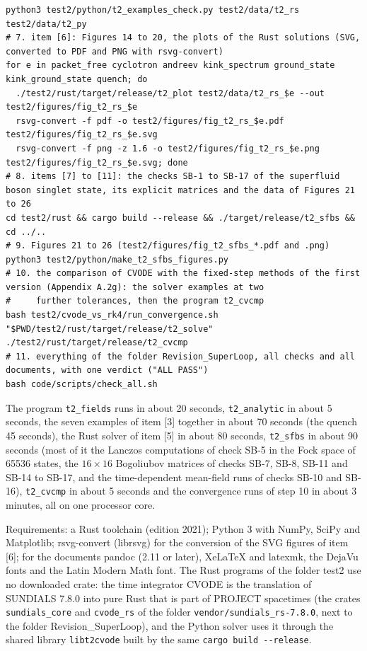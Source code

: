 \documentclass[
  10pt,
]{article}
\begin{document}
\begin{verbatim}
python3 test2/python/t2_examples_check.py test2/data/t2_rs test2/data/t2_py
# 7. item [6]: Figures 14 to 20, the plots of the Rust solutions (SVG, converted to PDF and PNG with rsvg-convert)
for e in packet_free cyclotron andreev kink_spectrum ground_state kink_ground_state quench; do
  ./test2/rust/target/release/t2_plot test2/data/t2_rs_$e --out test2/figures/fig_t2_rs_$e
  rsvg-convert -f pdf -o test2/figures/fig_t2_rs_$e.pdf test2/figures/fig_t2_rs_$e.svg
  rsvg-convert -f png -z 1.6 -o test2/figures/fig_t2_rs_$e.png test2/figures/fig_t2_rs_$e.svg; done
# 8. items [7] to [11]: the checks SB-1 to SB-17 of the superfluid boson singlet state, its explicit matrices and the data of Figures 21 to 26
cd test2/rust && cargo build --release && ./target/release/t2_sfbs && cd ../..
# 9. Figures 21 to 26 (test2/figures/fig_t2_sfbs_*.pdf and .png)
python3 test2/python/make_t2_sfbs_figures.py
# 10. the comparison of CVODE with the fixed-step methods of the first version (Appendix A.2g): the solver examples at two
#     further tolerances, then the program t2_cvcmp
bash test2/cvode_vs_rk4/run_convergence.sh "$PWD/test2/rust/target/release/t2_solve"
./test2/rust/target/release/t2_cvcmp
# 11. everything of the folder Revision_SuperLoop, all checks and all documents, with one verdict ("ALL PASS")
bash code/scripts/check_all.sh
\end{verbatim}

The program \texttt{t2\_fields} runs in about 20 seconds,
\texttt{t2\_analytic} in about 5 seconds, the seven examples of item
{[}3{]} together in about 70 seconds (the quench 45 seconds), the Rust
solver of item {[}5{]} in about 80 seconds, \texttt{t2\_sfbs} in about
90 seconds (most of it the Lanczos computations of check SB-5 in the
Fock space of 65536 states, the \(16\times16\) Bogoliubov matrices of
checks SB-7, SB-8, SB-11 and SB-14 to SB-17, and the time-dependent
mean-field runs of checks SB-10 and SB-16), \texttt{t2\_cvcmp} in about
5 seconds and the convergence runs of step 10 in about 3 minutes, all on
one processor core.

Requirements: a Rust toolchain (edition 2021); Python 3 with NumPy,
SciPy and Matplotlib; rsvg-convert (librsvg) for the conversion of the
SVG figures of item {[}6{]}; for the documents pandoc (2.11 or later),
XeLaTeX and latexmk, the DejaVu fonts and the Latin Modern Math font.
The Rust programs of the folder test2 use no downloaded crate: the time
integrator CVODE is the translation of SUNDIALS 7.8.0 into pure Rust
that is part of PROJECT spacetimes (the crates \texttt{sundials\_core}
and \texttt{cvode\_rs} of the folder \texttt{vendor/sundials\_rs-7.8.0},
next to the folder Revision\_SuperLoop), and the Python solver uses it
through the shared library \texttt{libt2cvode} built by the same
\texttt{cargo\ build\ -\/-release}.
\end{document}
